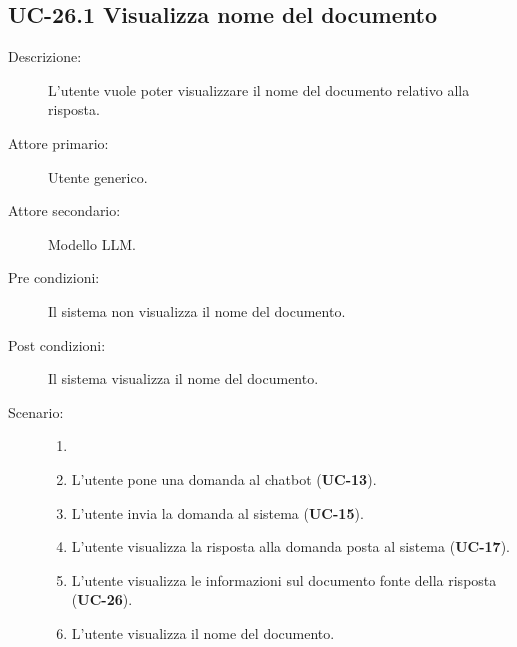 \subsection{UC-26.1 Visualizza nome del documento}
\begin{description}
    \item[Descrizione:] L'utente vuole poter visualizzare il nome del documento relativo alla risposta.
    \item[Attore primario:] Utente generico.
    \item[Attore secondario:] Modello LLM.
    \item[Pre condizioni:] Il sistema non visualizza il nome del documento.
    \item[Post condizioni:] Il sistema visualizza il nome del documento.
    \item[Scenario:] 
    \begin{enumerate}
        \item[]
        \item L’utente pone una domanda al chatbot (\textbf{UC-13}).
        \item L'utente invia la domanda al sistema (\textbf{UC-15}).
        \item L'utente visualizza la risposta alla domanda posta al sistema (\textbf{UC-17}).
        \item L'utente visualizza le informazioni sul documento fonte della risposta (\textbf{UC-26}).
        \item L'utente visualizza il nome del documento.
    \end{enumerate}
\end{description}

